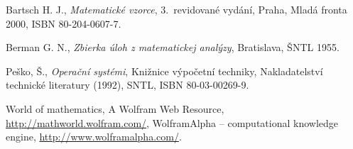 \begin{thebibliography}{99}                                \label{literatura}

Bartsch H. J.,
{\it Matematické vzorce}, 
3.~revidované vydání, Praha, Mladá fronta 2000, ISBN 80-204-0607-7.
         
Berman G. N.,
{\it Zbierka úloh z matematickej analýzy}, 
Bratislava, ŠNTL 1955.
         
Peško, Š., 
{\it Operační systémi}, 
Knižnice výpočetní techniky, 
Nakladatelství technické literatury (1992), 
SNTL, ISBN 80-03-00269-9.



World of mathematics, A Wolfram Web Resource, 
\url{http://mathworld.wolfram.com/}, 
WolframAlpha -- computational knowledge engine, 
\url{http://www.wolframalpha.com/}.


\end{thebibliography}

